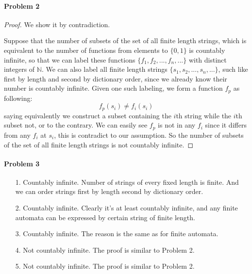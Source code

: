\documentclass[12pt]{article}
\begin{document}
\bigskip

\paragraph{Problem 2} 
\begin{proof}
We show it by contradiction.

Suppose that the number of subsets  of the set of all finite length strings,
which is equivalent to the number of functions from elements to $\{0, 1\}$ is countably infinite,
so that we can label these functions $\{f_1, f_2, ..., f_n, ...\}$ with distinct integers of $\mathbb{N}$.
We can also label all finite length strings $\{s_1, s_2, ..., s_n, ...\}$,
such like first by length and second by dictionary order,
since we already know their number is countably infinite.
Given one such labeling, we form a function $f_p$ as following:
$$
f_p(s_i) \not= f_i(s_i)
$$
saying equivalently we construct a subset containing the $i$th string while the $i$th subset not,
or to the contrary.
We can easily see $f_p$ is not in any $f_i$ since it differs from any $f_i$ at $s_i$,
this is contradict to our assumption.
So the number of subsets of the set of all finite length strings is not countably infinite.
\end{proof}
\bigskip

\paragraph{Problem 3} 
\begin{itemize}
\item[1.]
Countably infinite.
Number of strings of every fixed length is finite.
And we can order strings first by length second by dictionary order.
\item[2.]
Countably infinite.
Clearly it's at least countably infinite,
and any finite automata can be expressed by certain string of finite length.
\item[3.]
Countably infinite.
The reason is the same as for finite automata.
\item[4.]
Not countably infinite.
The proof is similar to Problem 2.
\item[5.]
Not countably infinite.
The proof is similar to Problem 2.

\end{itemize}
\end{document}
